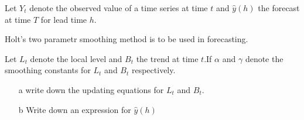 
Let $Y_t$ denote the observed value of a time series at time $t$ and $\hat{y}(h)$ the forecast at time $T$ for lead time $h$.

Holt's two parametr smoothing method is to be used in forecasting.

Let $L_t$ denote the local level and $B_t$ the trend at time $t$.If $\alpha$ and $\gamma$ denote the smoothing constants for $L_t$
and $B_t$ respectively.

\begin{itemize}
\item[a] write down the updating equations for $L_t$ and $B_t$.
\item[b] Write down an expression for $\hat{y}(h)$ 
\end{itemize}
